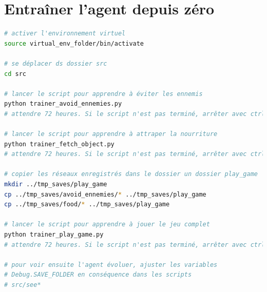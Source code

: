 \documentclass[11pt,a4paper]{report}
\begin{document}
\section{Entraîner l'agent depuis zéro}
\begin{lstlisting}[language=bash]
# activer l'environnement virtuel
source virtual_env_folder/bin/activate

# se déplacer ds dossier src
cd src 

# lancer le script pour apprendre à éviter les ennemis
python trainer_avoid_ennemies.py
# attendre 72 heures. Si le script n'est pas terminé, arrêter avec ctrl+c

# lancer le script pour apprendre à attraper la nourriture
python trainer_fetch_object.py
# attendre 72 heures. Si le script n'est pas terminé, arrêter avec ctrl+c

# copier les réseaux enregistrés dans le dossier un dossier play_game
mkdir ../tmp_saves/play_game
cp ../tmp_saves/avoid_ennemies/* ../tmp_saves/play_game
cp ../tmp_saves/food/* ../tmp_saves/play_game

# lancer le script pour apprendre à jouer le jeu complet
python trainer_play_game.py
# attendre 72 heures. Si le script n'est pas terminé, arrêter avec ctrl+c

# pour voir ensuite l'agent évoluer, ajuster les variables 
# Debug.SAVE_FOLDER en conséquence dans les scripts
# src/see*

  \end{lstlisting}  
\end{document}
